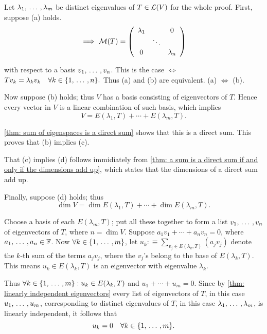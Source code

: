 \begin{prf}
  Let $\lambda_1, {\, \ldots \,\,}, \lambda_m$ be distinct eigenvalues of $T \in \mathcal{L} (V)$ for the whole proof. First, suppose (a) holds.
  \begin{equation}
    \implies
    \mathcal{M}(T) =
    \left( {\begin{array}{ccc}
        \lambda_1 &         & 0 \\
        &  \ddots &    \\
        0      &         & \lambda_n
    \end{array} } \right)
  \end{equation}

  with respect to a basis $v_1, {\, \ldots \,\,}, v_n$. This is the case $\iff$ $Tv_k = \lambda_k v_k \quad \forall k\in \{1, {\, \ldots \,\,}, n \}.$ Thus (a) and (b) are equivalent. (a) $\iff$ (b).

  Now suppose (b) holds; thus $V$ has a basis consisting of eigenvectors of $T$. Hence every vector in $V$ is a linear combination of such basis, which implies
  \begin{equation}
    V = E(\lambda_1, T) + \cdots + E(\lambda_m, T).
  \end{equation}

  \ref{thm: sum of eigenspaces is a direct sum} shows that this is a direct sum. This proves that (b) implies (c).

  That (c) implies (d) follows immidiately from \ref{thm: a sum is a direct sum if and only if the dimensions add up}, which states that the dimensions of a direct sum add up.

  Finally, suppose (d) holds; thus
  \begin{equation}
    \dim V = \dim E(\lambda_1, T) + \cdots + \dim E(\lambda_m, T).
  \end{equation}

  Choose a basis of each $E(\lambda_m, T)$; put all these together to form a list $v_1, {\, \ldots \,\,}, v_n$ of eigenvectors of $T$, where $n = \dim V$. Suppose $a_1 v_1 + \cdots + a_n v_n = 0$, where $a_1, {\, \ldots \,\,}, a_n \in \mathbb{F}$.
  Now $\forall k \in \{1, {\, \ldots \,\,}, m \}$, let
  $
  \displaystyle
    u_k :\equiv \sum_{v_j \in E(\lambda_k, T)} (a_j v_j)
  $
  denote the $k$-th sum of the terms $a_jv_j$, where the $v_j$'s belong to the base of $E(\lambda_k, T)$. This means $u_k \in E(\lambda_k, T)$ is an eigenvector with eigenvalue $\lambda_k$.

  Thus $\forall k \in \{1, {\, \ldots \,\,}, m \}: u_k \in E(\lambda_k, T)$ and $u_1 + \cdots + u_m = 0$. Since by \ref{thm: linearly independent eigenvectors}
  every list of eigenvectors of $T$, in this case $u_1, {\, \ldots \,\,}, u_m$, corresponding to distinct eigenvalues of $T$, in this case $\lambda_1, {\, \ldots \,\,}, \lambda_m$, is linearly independent, it follows that
  \begin{equation}
    u_k = 0 \quad \forall k \in \{1, {\, \ldots \,\,}, m \}.
  \end{equation}


\end{prf}
